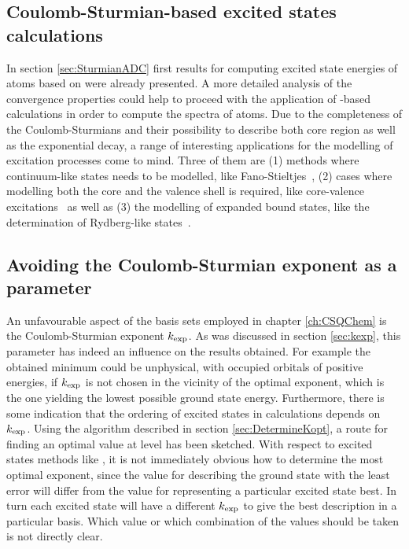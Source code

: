 \subsection{Coulomb-Sturmian-based excited states calculations}
\label{sec:SturmianExcited}
In section \ref{sec:SturmianADC} first results
for computing excited state energies of atoms based on \ADC
were already presented.
A more detailed analysis of the convergence properties
could help to proceed with the application of \CS-based \ADC
calculations in order to compute the spectra of atoms.
Due to the completeness of the Coulomb-Sturmians
and their possibility to describe both core region as well as
the exponential decay,
a range of interesting applications for the modelling
of excitation processes come to mind.
Three of them are
(1) methods where continuum-like states needs to be modelled,
like Fano-Stieltjes~\cite{Feshbach1958,Feshbach1962,Santra2002},
(2) cases where modelling both the core and the valence shell is required,
like core-valence excitations~\cite{Wenzel2014,Wenzel2016}
as well as
(3) the modelling of expanded bound states,
like the determination of Rydberg-like states~\cite{Kaufmann1989,Riss1993}.

\subsection{Avoiding the Coulomb-Sturmian exponent as a parameter}
An unfavourable aspect of the \CS basis sets
employed in chapter \ref{ch:CSQChem} is
the Coulomb-Sturmian exponent $k_\text{exp}$.
As was discussed in section \ref{sec:kexp},
this parameter has indeed an influence on the results obtained.
For example the obtained \SCF minimum could be unphysical,
\ie with occupied orbitals of positive energies,
if $k_\text{exp}$ is not chosen in the vicinity of the optimal exponent,
which is the one yielding the lowest possible \HF ground state energy.
Furthermore, there is some indication
that the ordering of excited states in \ADC calculations depends on $k_\text{exp}$.
Using the algorithm described in section \ref{sec:DetermineKopt},
a route for finding an optimal value at \HF level has been sketched.
With respect to excited states methods like \ADC,
it is not immediately obvious how to determine the most optimal exponent,
since the value for describing the ground state with the least error
will differ from the value for representing a particular excited state best.
In turn each excited state will have a different $k_\text{exp}$
to give the best description in a particular \CS basis.
Which value or which combination of the values should be taken
is not directly clear.

